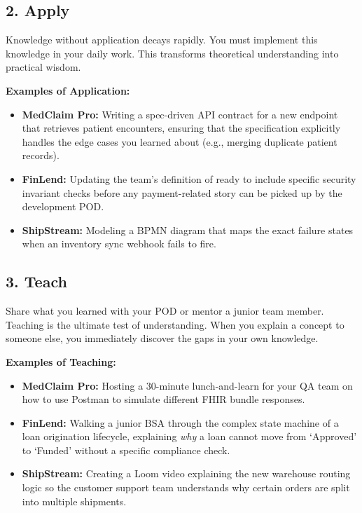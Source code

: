\subsection{2. Apply}\label{apply}

Knowledge without application decays rapidly. You must implement this
knowledge in your daily work. This transforms theoretical understanding
into practical wisdom.

\textbf{Examples of Application:}

\begin{itemize}
\tightlist
\item
  \textbf{MedClaim Pro:} Writing a spec-driven API contract for a new
  endpoint that retrieves patient encounters, ensuring that the
  specification explicitly handles the edge cases you learned about
  (e.g., merging duplicate patient records).
\item
  \textbf{FinLend:} Updating the team's definition of ready to include
  specific security invariant checks before any payment-related story
  can be picked up by the development POD.
\item
  \textbf{ShipStream:} Modeling a BPMN diagram that maps the exact
  failure states when an inventory sync webhook fails to fire.
\end{itemize}

\subsection{3. Teach}\label{teach}

Share what you learned with your POD or mentor a junior team member.
Teaching is the ultimate test of understanding. When you explain a
concept to someone else, you immediately discover the gaps in your own
knowledge.

\textbf{Examples of Teaching:}

\begin{itemize}
\tightlist
\item
  \textbf{MedClaim Pro:} Hosting a 30-minute lunch-and-learn for your QA
  team on how to use Postman to simulate different FHIR bundle
  responses.
\item
  \textbf{FinLend:} Walking a junior BSA through the complex state
  machine of a loan origination lifecycle, explaining \emph{why} a loan
  cannot move from `Approved' to `Funded' without a specific compliance
  check.
\item
  \textbf{ShipStream:} Creating a Loom video explaining the new
  warehouse routing logic so the customer support team understands why
  certain orders are split into multiple shipments.
\end{itemize}

